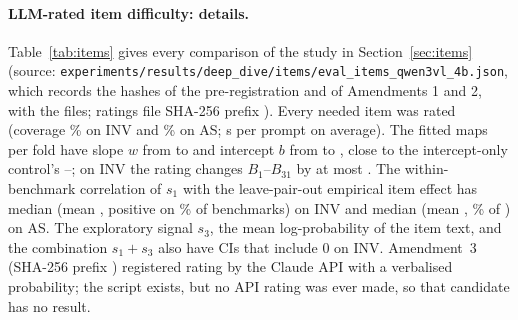 \documentclass{article}
\begin{document}
\paragraph{LLM-rated item difficulty: details.} Table~\ref{tab:items} gives every comparison of the study in Section~\ref{sec:items} (source: \texttt{experiments/results/deep\_dive/items/eval\_items\_qwen3vl\_4b.json}, which records the hashes of the pre-registration and of Amendments 1 and 2, \ItPreregConsistent{} with the files; ratings file SHA-256 prefix \texttt{\ItRatingsSha}). Every needed item was rated (coverage \ItInvCoverage\% on INV and \ItAsCoverage\% on AS; \ItRatingSecPerPrompt{} s per prompt on average). The fitted maps per fold have slope $w$ from \ItWMin{} to \ItWMax{} and intercept $b$ from \ItBMin{} to \ItBMax{}, close to the intercept-only control's \ItBOnlyMin--\ItBOnlyMax; on INV the rating changes $B_1$--$B_{31}$ by at most \ItInvSOneDLaterMax. The within-benchmark correlation of $s_1$ with the leave-pair-out empirical item effect has median \ItCorrInvMedian{} (mean \ItCorrInvMean, positive on \ItCorrInvFracPos\% of \ItCorrInvNBench{} benchmarks) on INV and median \ItCorrAsMedian{} (mean \ItCorrAsMean, \ItCorrAsFracPos\% of \ItCorrAsNBench) on AS. The exploratory signal $s_3$, the mean log-probability of the item text, and the combination $s_1+s_3$ also have CIs that include 0 on INV. Amendment~3 (SHA-256 prefix \texttt{\ItAmThreeSha}) registered rating by the Claude API with a verbalised probability; the script exists, but no API rating was ever made, so that candidate has no result.

\begin{table}[htbp]
\caption{Pre-registered item-difficulty study (\ItModel, $s_1=\log P(\text{Yes})-\log P(\text{No})$): ALC of each variant, its difference to the base (\SelId; INV \ItInvBaseAlc, AS \ItAsBaseAlc) with 95\% cluster-bootstrap CI over benchmarks, and the budget-0 part of that difference. The last row is the Amendment-2 comparison against the intercept-only control. Gate: (a) INV CI below 0 \ItGateBaseA{} against the base and \ItGateCtrlA{} against the control; (b) AS not significantly worse \ItGateBaseB.}
\label{tab:items}
\centering\footnotesize\setlength{\tabcolsep}{3pt}
\end{table}
\end{document}
